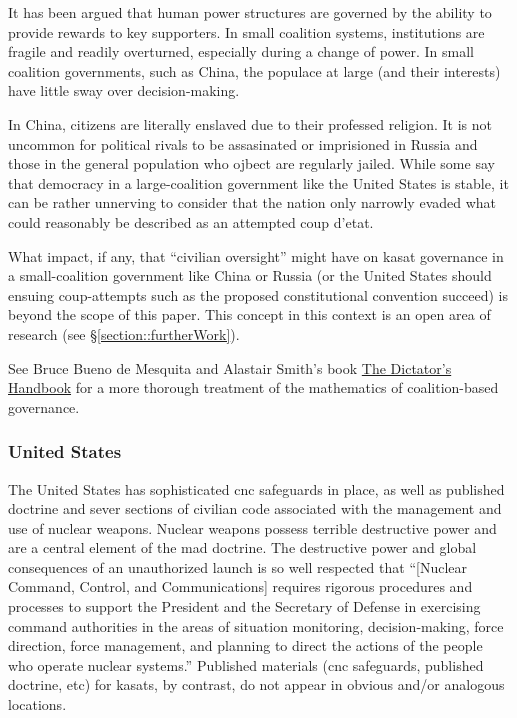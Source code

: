 It has been argued that human power structures are governed by the
ability to provide rewards to key supporters.\cite[ch1]{dictator} In
small coalition systems, institutions are fragile and readily
overturned, especially during a change of power.\cite[ch2]{dictator}
In small coalition governments, such as China, the populace at large
(and their interests) have little sway over
decision-making.\cite[ch1]{dictator}

In China, citizens are literally enslaved due to their professed
religion.\cite{uyghurs} It is not uncommon for political rivals to be
assasinated\cite{polonium} or imprisioned\cite{navalny} in Russia and
those in the general population who ojbect are regularly
jailed.\cite{protestors-jailed} While some say that democracy in a
large-coalition government like the United States is
stable\cite[ch10]{dictator}, it can be rather unnerving to consider
that the nation only narrowly evaded what could reasonably be
described as an attempted coup
d'etat.\cite{coup-coup-clock}\cite{coup-coup-click}

What impact, if any, that ``civilian oversight'' might have on
\ac{kasat} governance in a small-coalition government like China or
Russia (or the United States should ensuing coup-attempts such as the
proposed constitutional convention succeed) is beyond the scope of
this paper.  This concept in this context is an open area of research
(see \S\ref{section::furtherWork}).

See Bruce Bueno de Mesquita and Alastair Smith's book
\href{https://www.publicaffairsbooks.com/titles/bruce-bueno-de-mesquita/the-dictators-handbook/9781541701366/}{The
  Dictator's Handbook} for a more thorough treatment of the
mathematics of coalition-based governance.


\subsubsection{United States}

The United States has sophisticated \ac{cnc} safeguards in place, as
well as published doctrine and sever sections of civilian code
associated with the management and use of nuclear weapons.\cite[the
  right joint publication]{xxx} Nuclear weapons possess terrible
destructive power and are a central element of the \ac{mad}
doctrine.\cite{getting-mad} The destructive power and global
consequences of an unauthorized launch is so well respected that
``[Nuclear Command, Control, and Communications] requires rigorous
procedures and processes to support the President and the Secretary of
Defense in exercising command authorities in the areas of situation
monitoring, decision-making, force direction, force management, and
planning to direct the actions of the people who operate nuclear
systems.''\cite{nuke-matters-handbook} Published materials (\ac{cnc}
safeguards, published doctrine, etc) for \acp{kasat}, by contrast, do
not appear in obvious and/or analogous locations.

